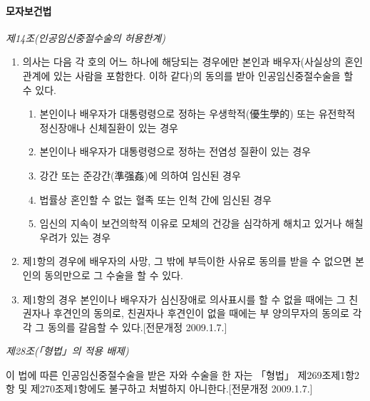 \paragraph{모자보건법}\par
\emph{제14조(인공임신중절수술의 허용한계)}
	\begin{enumerate}[①]\tightlist
	\item 의사는 다음 각 호의 어느 하나에 해당되는 경우에만 본인과 배우자(사실상의 혼인관계에 있는 사람을 포함한다. 이하 같다)의 동의를 받아 인공임신중절수술을 할 수 있다.
		\begin{enumerate}[1.]\tightlist
		\item 본인이나 배우자가 대통령령으로 정하는 우생학적(優生學的) 또는 유전학적 정신장애나 신체질환이 있는 경우
		\item 본인이나 배우자가 대통령령으로 정하는 전염성 질환이 있는 경우
		\item 강간 또는 준강간(準强姦)에 의하여 임신된 경우
		\item 법률상 혼인할 수 없는 혈족 또는 인척 간에 임신된 경우
		\item 임신의 지속이 보건의학적 이유로 모체의 건강을 심각하게 해치고 있거나 해칠 우려가 있는 경우
		\end{enumerate}
	\item 제1항의 경우에 배우자의 사망, 그 밖에 부득이한 사유로 동의를 받을 수 없으면 본인의 동의만으로 그 수술을 할 수 있다.
	\item 제1항의 경우 본인이나 배우자가 심신장애로 의사표시를 할 수 없을 때에는 그 친권자나 후견인의 동의로, 친권자나 후견인이 없을 때에는 부
	양의무자의 동의로 각각 그 동의를 갈음할 수 있다.[전문개정 2009.1.7.]
	\end{enumerate}
\emph{제28조(「형법」의 적용 배제)}\par
이 법에 따른 인공임신중절수술을 받은 자와 수술을 한 자는 「형법」 제269조제1항2항 및 제270조제1항에도 불구하고 처벌하지 아니한다.[전문개정 2009.1.7.]\par \medskip

